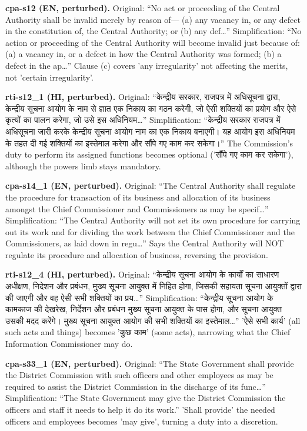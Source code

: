 \documentclass[conference]{IEEEtran}
\newcommand{\dev}[1]{{\devfont #1}}
\begin{document}
{\noindent\textbf{cpa-s12 (EN, perturbed).} Original: ``No act or proceeding of the Central Authority shall be invalid merely by reason of— (a) any vacancy in, or any defect in the constitution of, the Central Authority; or (b) any def…'' Simplification: ``No action or proceeding of the Central Authority will become invalid just because of: (a) a vacancy in, or a defect in how the Central Authority was formed; (b) a defect in the ap…'' Clause (c) covers 'any irregularity' not affecting the merits, not 'certain irregularity'.

\noindent\textbf{rti-s12\_1 (HI, perturbed).} Original: ``\dev{केन्द्रीय सरकार, राजपत्र में अधिसूचना द्वारा, केन्द्रीय सूचना आयोग के नाम से ज्ञात एक निकाय का गठन करेगी, जो ऐसी शक्तियों का प्रयोग और ऐसे कृत्यों का पालन करेगा, जो उसे इस अधिनियम}…'' Simplification: ``\dev{केन्द्रीय सरकार राजपत्र में अधिसूचना जारी करके केन्द्रीय सूचना आयोग नाम का एक निकाय बनाएगी। यह आयोग इस अधिनियम के तहत दी गई शक्तियों का इस्तेमाल करेगा और सौंपे गए काम कर सकेगा।}'' The Commission's duty to perform its assigned functions becomes optional ('\dev{सौंपे गए काम कर सकेगा}'), although the powers limb stays mandatory.

\noindent\textbf{cpa-s14\_1 (EN, perturbed).} Original: ``The Central Authority shall regulate the procedure for transaction of its business and allocation of its business amongst the Chief Commissioner and Commissioners as may be specif…'' Simplification: ``The Central Authority will not set its own procedure for carrying out its work and for dividing the work between the Chief Commissioner and the Commissioners, as laid down in regu…'' Says the Central Authority will NOT regulate its procedure and allocation of business, reversing the provision.

\noindent\textbf{rti-s12\_4 (HI, perturbed).} Original: ``\dev{केन्द्रीय सूचना आयोग के कार्यों का साधारण अधीक्षण, निदेशन और प्रबंधन, मुख्य सूचना आयुक्त में निहित होगा, जिसकी सहायता सूचना आयुक्तों द्वारा की जाएगी और वह ऐसी सभी शक्तियों का प्रय}…'' Simplification: ``\dev{केन्द्रीय सूचना आयोग के कामकाज की देखरेख, निर्देशन और प्रबंधन मुख्य सूचना आयुक्त के पास होगा, और सूचना आयुक्त उसकी मदद करेंगे। मुख्य सूचना आयुक्त आयोग की सभी शक्तियों का इस्तेमाल}…'' '\dev{ऐसे सभी कार्य}' (all such acts and things) becomes '\dev{कुछ काम}' (some acts), narrowing what the Chief Information Commissioner may do.

\noindent\textbf{cpa-s33\_1 (EN, perturbed).} Original: ``The State Government shall provide the District Commission with such officers and other employees as may be required to assist the District Commission in the discharge of its func…'' Simplification: ``The State Government may give the District Commission the officers and staff it needs to help it do its work.'' 'Shall provide' the needed officers and employees becomes 'may give', turning a duty into a discretion.

}
\end{document}
